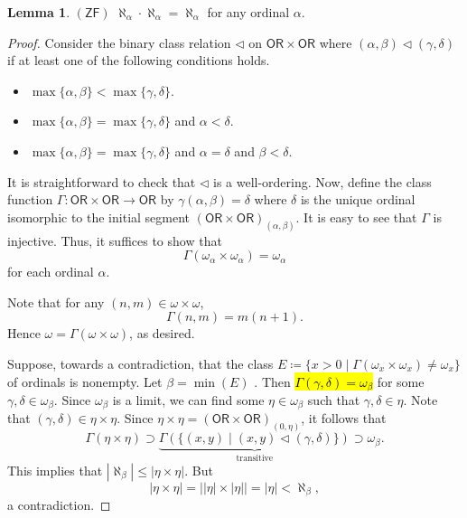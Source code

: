 \documentclass[10pt,letterpaper,cm]{nupset}
\theoremstyle{definition}
\theoremstyle{theorem}
\newtheorem{lemma}[definition]{Lemma}
\theoremstyle{remark}
\newcommand{\1}{\mathbf{1}}
\newcommand{\0}{\vec 0}
\newcommand{\zf}{\mathsf{ZF}}
\newcommand{\ord}{\mathsf{OR}}
\begin{document}
\begin{lemma}{$(\zf)$}
$\aleph_{\alpha} \cdot \aleph_{\alpha} = \aleph_{\alpha}$ for any ordinal $\alpha$.
\end{lemma}
\begin{proof} 
Consider the binary class relation $\lhd$ on $\ord \times \ord$ where $\left(\alpha, \beta\right)\lhd \left(\gamma, \delta\right)$ if at least one of the following conditions holds.
\begin{itemize}
\item  $\max\{\alpha, \beta\} <\max\{\gamma, \delta\}$.
\item $\max\{\alpha, \beta\} = \max\{\gamma, \delta\}$ and $\alpha < \delta$.
\item $\max\{\alpha, \beta\} = \max\{\gamma, \delta\}$ and $\alpha =\delta$ and $\beta < \delta$. 
\end{itemize}$ $It is straightforward to check that $\lhd$ is a well-ordering. Now, define the class function $\Gamma : \ord \times \ord \to \ord$ by $\gamma(\alpha, \beta) = \delta$ where $\delta$ is the unique ordinal isomorphic to the initial segment $\left(\ord \times \ord\right)_{(\alpha, \beta)}$. It is easy to see that $\Gamma$ is injective. Thus, it suffices to show that $$\Gamma(\omega_{\alpha} \times \omega_{\alpha}) = \omega_{\alpha}$$ for each ordinal $\alpha$. 

\smallskip

Note that for any $\left(n,m\right) \in \omega \times \omega$, $$ \Gamma(n,m) = 
m(n+1).$$ Hence $\omega =\Gamma(\omega \times \omega)$, as desired.  

\smallskip
 Suppose, towards a contradiction, that the class $E\coloneqq \{x >0 \mid \Gamma(\omega_{x} \times \omega_{x}) \ne \omega_{x}\}$ of ordinals is nonempty. Let $\beta = \min( E )$ . Then \hl{$\Gamma(\gamma, \delta) = \omega_{\beta}$} for some $\gamma, \delta \in \omega_{\beta}$. Since $\omega_{\beta}$ is a limit, we can find some $\eta \in \omega_{\beta}$ such that $\gamma,\delta \in \eta$. Note that $\left(\gamma, \delta\right) \in \eta \times \eta$. Since $\eta \times \eta = \left(\ord \times \ord\right)_{(0, \eta)}$, it follows that $$\Gamma(\eta \times \eta) \supset \underbrace{\Gamma(\{\left(x,y\right) \mid \left(x,y\right) \lhd \left(\gamma, \delta\right)\})}_{\text{transitive}} \supset \omega_{\beta}. $$ This implies that $\left\lvert{\aleph_{\beta}}\right\rvert \leq \left\lvert{\eta \times \eta}\right\rvert$. But $$\left\lvert{\eta \times \eta}\right\rvert=  \left\lvert{\left\lvert{\eta}\right\rvert \times \left\lvert{\eta}\right\rvert}\right\rvert = \left\lvert{\eta}\right\rvert < \aleph_{\beta}   ,$$ a contradiction. 
\end{proof}
\end{document}
